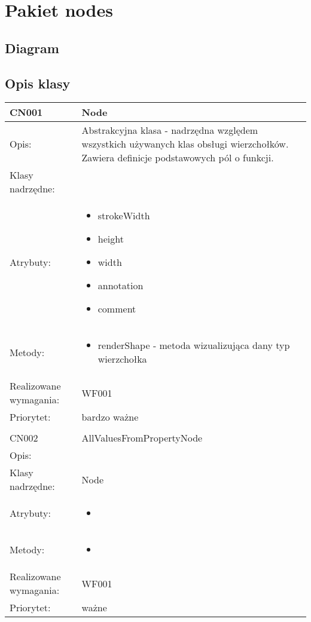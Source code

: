 \documentclass[a4paper,10pt]{article}
\begin{document}
\section{Pakiet nodes}

\subsection{Diagram}

\subsection{Opis klasy}

\begin{center}
 


\begin{longtable}{|m{3cm}|m{9cm}|} \hline

CN001 & Node \\ \hline
Opis: & Abstrakcyjna klasa - nadrzędna względem wszystkich używanych klas obsługi wierzchołków. Zawiera definicje podstawowych pól o funkcji.    \\ \hline
Klasy nadrzędne: &     \\ \hline
Atrybuty: & \begin{itemize}
 \item strokeWidth
 \item height
 \item width
 \item annotation
 \item comment 
\end{itemize}
 \\ \hline
Metody: & \begin{itemize}
 \item renderShape - metoda wizualizująca dany typ wierzchołka
\end{itemize}
  \\ \hline
Realizowane wymagania: & WF001 \\ \hline
Priorytet: & bardzo ważne  \\ \hline

\multicolumn{2}{c}{} \\
 \hline

CN002 & AllValuesFromPropertyNode \\ \hline
Opis: &     \\ \hline
Klasy nadrzędne: & Node     \\ \hline
Atrybuty: & \begin{itemize}
 \item 
\end{itemize}
 \\ \hline
Metody: & \begin{itemize}
 \item 
\end{itemize}
  \\ \hline
Realizowane wymagania: & WF001 \\ \hline
Priorytet: & ważne \\ \hline


\end{longtable}
\end{center}
\end{document}
